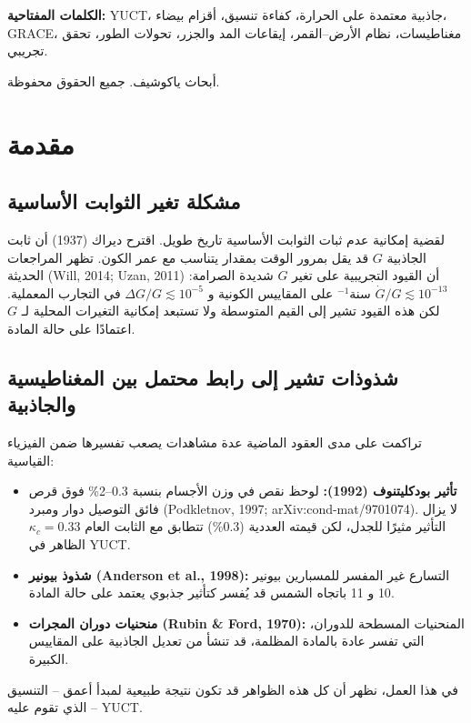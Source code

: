 \documentclass[11pt,a4paper]{article}
\newcommand{\kappac}{\kappa_c}
\begin{document}
\begin{titlepage}
		\vspace{0.3cm}
		\noindent
		\small\textbf{الكلمات المفتاحية:} YUCT، جاذبية معتمدة على الحرارة، كفاءة تنسيق، أقزام بيضاء، GRACE، مغناطيسات، نظام الأرض–القمر، إيقاعات المد والجزر، تحولات الطور، تحقق تجريبي.
		
		\vspace{0.1cm}
		\noindent
		 أبحاث ياكوشيف. جميع الحقوق محفوظة.
	\end{titlepage}
	
	\tableofcontents
	\newpage
	
	\section{مقدمة}
	\label{sec:intro}
	
	\subsection{مشكلة تغير الثوابت الأساسية}
	\label{subsec:constants-variation}
	
	لقضية إمكانية عدم ثبات الثوابت الأساسية تاريخ طويل. اقترح ديراك (1937) أن ثابت الجاذبية $G$ قد يقل بمرور الوقت بمقدار يتناسب مع عمر الكون. تظهر المراجعات الحديثة (Will, 2014; Uzan, 2011) أن القيود التجريبية على تغير $G$ شديدة الصرامة: $\dot{G}/G \lesssim 10^{-13}$ سنة$^{-1}$ على المقاييس الكونية و $\Delta G/G \lesssim 10^{-5}$ في التجارب المعملية. لكن هذه القيود تشير إلى القيم المتوسطة ولا تستبعد إمكانية التغيرات المحلية لـ $G$ اعتمادًا على حالة المادة.
	
	\subsection{شذوذات تشير إلى رابط محتمل بين المغناطيسية والجاذبية}
	\label{subsec:anomalies}
	
	تراكمت على مدى العقود الماضية عدة مشاهدات يصعب تفسيرها ضمن الفيزياء القياسية:
	\begin{itemize}
		\item \textbf{تأثير بودكليتنوف (1992):} لوحظ نقص في وزن الأجسام بنسبة 0.3–2\% فوق قرص فائق التوصيل دوار ومبرد (Podkletnov, 1997; arXiv:cond-mat/9701074). لا يزال التأثير مثيرًا للجدل، لكن قيمته العددية (0.3\%) تتطابق مع الثابت العام $\kappac = 0.33$ الظاهر في YUCT.
		\item \textbf{شذوذ بيونير (Anderson et al., 1998):} التسارع غير المفسر للمسبارين بيونير 10 و 11 باتجاه الشمس قد يُفسر كتأثير جذبوي يعتمد على حالة المادة.
		\item \textbf{منحنيات دوران المجرات (Rubin \& Ford, 1970):} المنحنيات المسطحة للدوران، التي تفسر عادة بالمادة المظلمة، قد تنشأ من تعديل الجاذبية على المقاييس الكبيرة.
	\end{itemize}
	في هذا العمل، نظهر أن كل هذه الظواهر قد تكون نتيجة طبيعية لمبدأ أعمق – التنسيق – الذي تقوم عليه YUCT.
	
\end{document}
